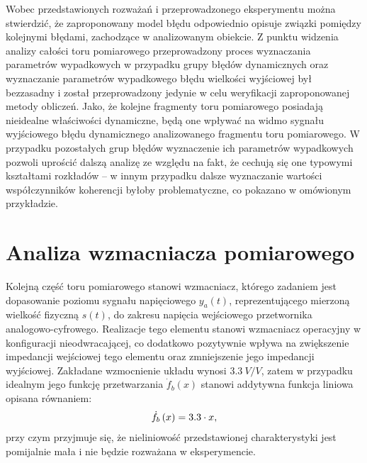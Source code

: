Wobec przedstawionych rozważań i przeprowadzonego eksperymentu można stwierdzić, że zaproponowany model błędu odpowiednio opisuje związki pomiędzy kolejnymi błędami, zachodzące w analizowanym obiekcie. Z punktu widzenia analizy całości toru pomiarowego przeprowadzony proces wyznaczania parametrów wypadkowych w przypadku grupy błędów dynamicznych oraz wyznaczanie parametrów wypadkowego błędu wielkości wyjściowej był bezzasadny i został przeprowadzony jedynie w celu weryfikacji zaproponowanej metody obliczeń. Jako, że kolejne fragmenty toru pomiarowego posiadają nieidealne właściwości dynamiczne, będą one wpływać na widmo sygnału wyjściowego błędu dynamicznego analizowanego fragmentu toru pomiarowego. W przypadku pozostałych grup błędów wyznaczenie ich parametrów wypadkowych pozwoli uprościć dalszą analizę ze względu na fakt, że cechują się one typowymi kształtami rozkładów -- w innym przypadku dalsze wyznaczanie wartości współczynników koherencji byłoby problematyczne, co pokazano w omówionym przykładzie.

\section{Analiza wzmacniacza pomiarowego}

Kolejną część toru pomiarowego stanowi wzmacniacz, którego zadaniem jest dopasowanie poziomu sygnału napięciowego $y_{a}(t)$, reprezentującego mierzoną wielkość fizyczną $s(t)$, do zakresu napięcia wejściowego przetwornika analogowo-cyfrowego. Realizacje tego elementu stanowi wzmacniacz operacyjny w konfiguracji nieodwracającej, co dodatkowo pozytywnie wpływa na zwiększenie impedancji wejściowej tego elementu oraz zmniejszenie jego impedancji wyjściowej. Zakładane wzmocnienie układu wynosi $\qty{3.3}{V \per V}$, zatem w przypadku idealnym jego funkcję przetwarzania $\dot{f}_{b}(x)$ stanowi addytywna funkcja liniowa opisana równaniem:
\begin{equation}
\dot{f}_{b} \left(x\right) = 3.3 \cdot x \label{eq:sym_partb_function},
\end{equation}
przy czym przyjmuje się, że nieliniowość przedstawionej charakterystyki jest pomijalnie mała i nie będzie rozważana w eksperymencie.

